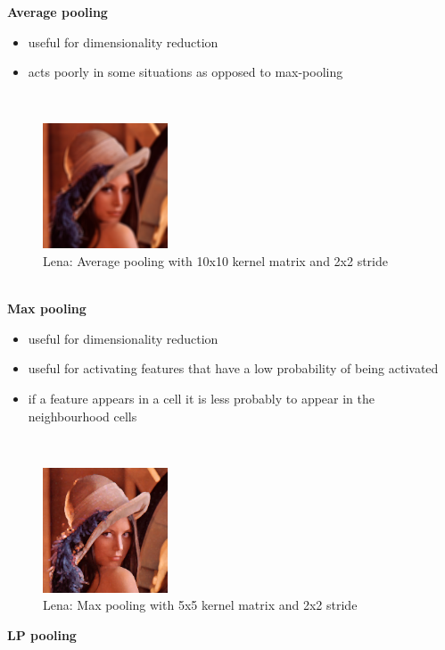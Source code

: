 \newpage
\textbf{Average pooling}
\begin{itemize}
	\item{useful for dimensionality reduction}
	\item{acts poorly in some situations as opposed to max-pooling}
\end{itemize}
~\\
\begin{figure}[h]
	\begin{center}
		\includegraphics[width=140px,height=140px]{src/img/state/lena-avgpooling}
		\caption{Lena: Average pooling with 10x10 kernel matrix and 2x2 stride} \label{fig:lena-avgpooling}
    \end{center}
\end{figure}

~\\

\textbf{Max pooling}
\begin{itemize}
	\item{useful for dimensionality reduction}
	\item{useful for activating features that have a low probability of being activated\cite{maxpooling}}
	\item{if a feature appears in a cell it is less probably to appear in the neighbourhood cells}
\end{itemize}
~\\
\begin{figure}[h]
	\begin{center}
		\includegraphics[width=140px,height=140px]{src/img/state/lena-maxpooling}
		\caption{Lena: Max pooling with 5x5 kernel matrix and 2x2 stride} \label{fig:lena-avgpooling}
    \end{center}
\end{figure}
\newpage
\textbf{LP pooling}

